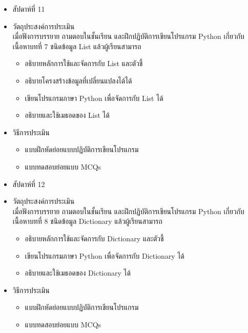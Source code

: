 \begin{tcolorbox}[breakable,enhanced,fonttitle=\bfseries]
\begin{itemize}
\item สัปดาห์ที่ 11
\item วัตถุประสงค์การประเมิน
	\\ เมื่อฟังการบรรยาย ถามตอบในชั้นเรียน และฝึกปฏิบัติการเขียนโปรแกรม Python เกี่ยวกับเนื้อหาบทที่ 7 ชนิดข้อมูล List แล้วผู้เรียนสามารถ
	\begin{itemize}
	\item อธิบายหลักการใช้และจัดการกับ List และตัวชี้
	\item อธิบายโครงสร้างข้อมูลที่เปลี่ยนแปลงได้ได้
	\item เขียนโปรแกรมภาษา Python เพื่อจัดการกับ List ได้
	\item อธิบายและใช้เมธอดของ List ได้
	\end{itemize}
\item วิธีการประเมิน
	\begin{itemize}
	\item แบบฝึกหัดย่อยแบบปฏิบัติการเขียนโปรแกรม
	\item แบบทดสอบย่อยแบบ MCQs
	\end{itemize}
\end{itemize}
\end{tcolorbox}
\vspace{1.5cm}

\begin{tcolorbox}[breakable,enhanced,fonttitle=\bfseries]
\begin{itemize}
\item สัปดาห์ที่ 12
\item วัตถุประสงค์การประเมิน
	\\ เมื่อฟังการบรรยาย ถามตอบในชั้นเรียน และฝึกปฏิบัติการเขียนโปรแกรม Python เกี่ยวกับเนื้อหาบทที่ 8 ชนิดข้อมูล Dictionary แล้วผู้เรียนสามารถ
	\begin{itemize}
	\item อธิบายหลักการใช้และจัดการกับ Dictionary และตัวชี้
	\item เขียนโปรแกรมภาษา Python เพื่อจัดการกับ Dictionary ได้
	\item อธิบายและใช้เมธอดของ Dictionary ได้
	\end{itemize}
\item วิธีการประเมิน
	\begin{itemize}
	\item แบบฝึกหัดย่อยแบบปฏิบัติการเขียนโปรแกรม
	\item แบบทดสอบย่อยแบบ MCQs
	\end{itemize}
\end{itemize}
\end{tcolorbox}
\vspace{1.5cm}

